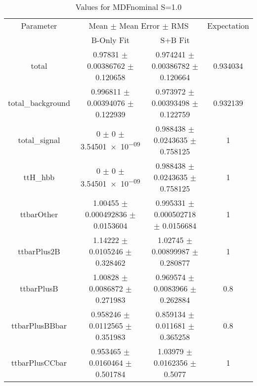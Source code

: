 \begin{table}
\centering
\caption{Values for MDFnominal S=1.0}
\begin{tabular}{cccc}
\toprule
Parameter & \multicolumn{2}{c}{Mean $\pm$ Mean Error $\pm$ RMS} & Expectation\\
 & B-Only Fit & S+B Fit & \\
\midrule
total & \num{0.97831} $\pm$ \num{0.00386762} $\pm$ \num{0.120658} & \num{0.974241} $\pm$ \num{0.00386782} $\pm$ \num{0.120664} & \num{0.934034}\\
total\_background & \num{0.996811} $\pm$ \num{0.00394076} $\pm$ \num{0.122939} & \num{0.973972} $\pm$ \num{0.00393498} $\pm$ \num{0.122759} & \num{0.932139}\\
total\_signal & \num{0} $\pm$ \num{0} $\pm$ \num{3.54501e-09} & \num{0.988438} $\pm$ \num{0.0243635} $\pm$ \num{0.758125} & \num{1}\\
ttH\_hbb & \num{0} $\pm$ \num{0} $\pm$ \num{3.54501e-09} & \num{0.988438} $\pm$ \num{0.0243635} $\pm$ \num{0.758125} & \num{1}\\
ttbarOther & \num{1.00455} $\pm$ \num{0.000492836} $\pm$ \num{0.0153604} & \num{0.995331} $\pm$ \num{0.000502718} $\pm$ \num{0.0156684} & \num{1}\\
ttbarPlus2B & \num{1.14222} $\pm$ \num{0.0105246} $\pm$ \num{0.328462} & \num{1.02745} $\pm$ \num{0.00899987} $\pm$ \num{0.280877} & \num{1}\\
ttbarPlusB & \num{1.00828} $\pm$ \num{0.0086872} $\pm$ \num{0.271983} & \num{0.969574} $\pm$ \num{0.0083966} $\pm$ \num{0.262884} & \num{0.8}\\
ttbarPlusBBbar & \num{0.958246} $\pm$ \num{0.0112565} $\pm$ \num{0.351983} & \num{0.859134} $\pm$ \num{0.011681} $\pm$ \num{0.365258} & \num{0.8}\\
ttbarPlusCCbar & \num{0.953465} $\pm$ \num{0.0160464} $\pm$ \num{0.501784} & \num{1.03979} $\pm$ \num{0.0162356} $\pm$ \num{0.5077} & \num{1}\\
\bottomrule
\end{tabular}
\end{table}